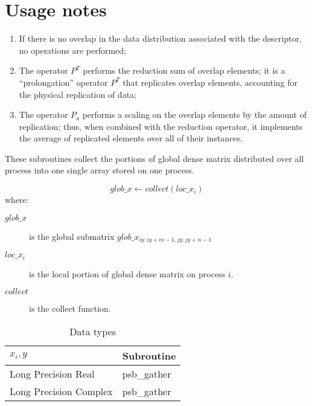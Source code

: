 \section*{Usage notes}
\begin{enumerate}
\item If there is no overlap in the data distribution associated with
  the descriptor, no operations are performed;
\item The operator $P^{T}$ performs the reduction sum of overlap
elements; it is a ``prolongation'' operator $P^T$ that
replicates overlap elements, accounting for the physical replication
of data;
\item The operator $P_a$ performs a scaling on the overlap elements by
the amount of replication; thus, when combined with the reduction
operator, it implements the average of replicated elements over all of
their instances. 
\end{enumerate}


%
%


These subroutines collect the portions of global dense matrix
distributed over all process into one single array stored on one
process.

\[ glob\_x \leftarrow collect(loc\_x_i) \]
where:
\begin{description}
\item[$glob\_x$] is the global submatrix $glob\_x_{iy:iy+m-1,jy:jy+n-1}$
\item[$loc\_x_i$] is the local portion of global dense matrix on
process $i$.
\item[$collect$] is the collect function.
\end{description}

\begin{table}[h]
\begin{center}
\begin{tabular}{ll}
\hline
$x_i, y$ & {\bf Subroutine}\\
\hline
Long Precision Real & psb\_gather \\
Long Precision Complex & psb\_gather \\
\hline
\end{tabular}
\end{center}
\caption{Data types\label{tab:gather}}
\end{table}

